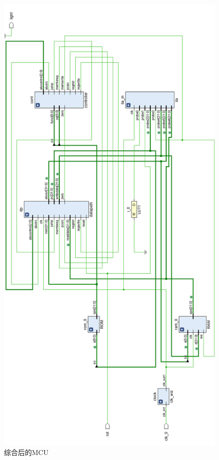 \documentclass[a4paper]{article}
\begin{document}
				\begin{figure}[htbp]
					\centering
					\includegraphics[scale=0.5]{综合后的MCU.png}
					\caption{综合后的MCU}
					\label{MCU after synthesis}
				\end{figure}
				\newpage
\end{document}
